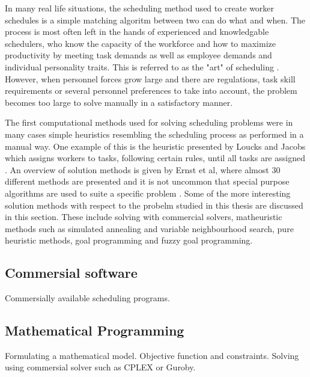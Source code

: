 In many real life situations, the scheduling method used to create worker schedules is a simple matching algoritm between two can do what and when. The process is most often left in the hands of experienced and knowledgable schedulers, who know the capacity of the workforce and how to maximize productivity by meeting task demands as well as employee demands and individual personality traits. This is referred to as the "art" of scheduling \citet{roberts_1983}. However, when personnel forces grow large and there are regulations, task skill requirements or several personnel preferences to take into account, the problem becomes too large to solve manually in a satisfactory manner.

The first computational methods used for solving scheduling problems were in many cases simple heuristics resembling the scheduling process as performed in a manual way. One example of this is the heuristic presented by Loucks and Jacobs which assigns workers to tasks, following certain rules, until all tasks are assigned \citet{loucks_1991}. An overview of solution methods is given by Ernst et al, where almost 30 different methods are presented  and it is not uncommon that special purpose algorithms are used to suite a specific problem \citet{ernst_2004}. Some of the more interesting solution methods with respect to the probelm studied in this thesis are discussed in this section. These include solving with commercial solvers, matheuristic methods such as simulated annealing and variable neighbourhood search, pure heuristic methods, goal programming and fuzzy goal programming.  



\subsection{Commersial software}

Commersially available scheduling programs.

\subsection{Mathematical Programming}

Formulating a mathematical model. Objective function and constraints. Solving using commersial solver such as CPLEX or Guroby.

